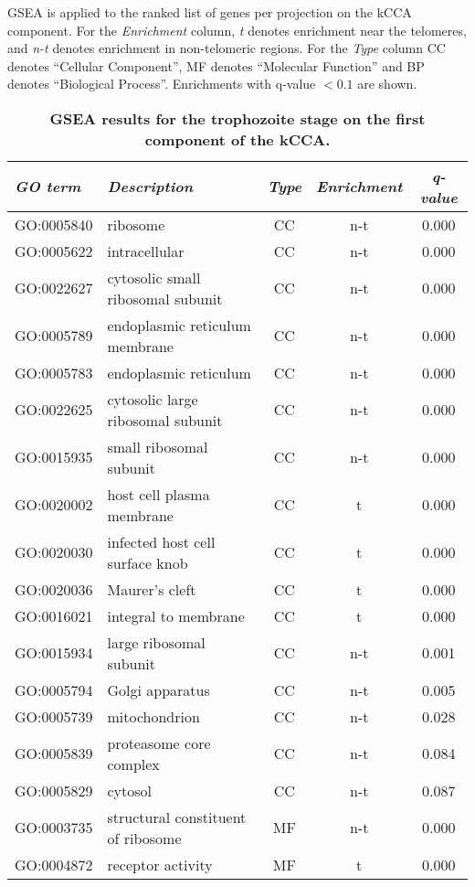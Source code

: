 \documentclass{article}
\begin{document}
\begin{table}
\caption{{\bf GSEA results for the trophozoite stage on the first component of the
kCCA.}}
{\normalsize GSEA is applied to the ranked list of genes per projection on the kCCA
component.
For the \emph{Enrichment} column, \emph{t} denotes enrichment near the
telomeres, and \emph{n-t} denotes enrichment in non-telomeric regions.
For the \emph{Type} column CC denotes ``Cellular Component'',
MF denotes ``Molecular Function'' and BP denotes ``Biological Process''.
Enrichments with q-value $< 0.1$ are shown.}
\vspace{10pt}
\begin{center}
\begin{tabular}{llccc}
\hline
\emph{GO term }&  \emph{Description} & \emph{Type} & \emph{Enrichment} & \emph{q-value}  \\
\hline
GO:0005840 & ribosome & CC & n-t & 0.000\\
GO:0005622 & intracellular & CC & n-t & 0.000\\
GO:0022627 & cytosolic small ribosomal subunit & CC & n-t & 0.000\\
GO:0005789 & endoplasmic reticulum membrane & CC & n-t & 0.000\\
GO:0005783 & endoplasmic reticulum & CC & n-t & 0.000\\
GO:0022625 & cytosolic large ribosomal subunit & CC & n-t & 0.000\\
GO:0015935 & small ribosomal subunit & CC & n-t & 0.000\\
GO:0020002 & host cell plasma membrane & CC & t & 0.000\\
GO:0020030 & infected host cell surface knob & CC & t & 0.000\\
GO:0020036 & Maurer's cleft & CC & t & 0.000\\
GO:0016021 & integral to membrane & CC & t & 0.000\\
GO:0015934 & large ribosomal subunit & CC & n-t & 0.001\\
GO:0005794 & Golgi apparatus & CC & n-t & 0.005\\
GO:0005739 & mitochondrion & CC & n-t & 0.028\\
GO:0005839 & proteasome core complex & CC & n-t & 0.084\\
GO:0005829 & cytosol & CC & n-t & 0.087\\
GO:0003735 & structural constituent of ribosome & MF & n-t & 0.000\\
GO:0004872 & receptor activity & MF & t & 0.000\\

\end{tabular}
\end{center}
\end{table}
\end{document}
